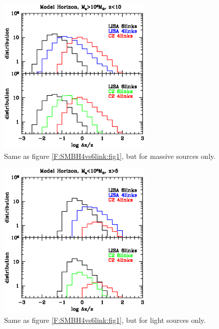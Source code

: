 \documentclass{iopart}
\begin{document}
\begin{figure}[H]
\center
   \includegraphics[width=0.65\textwidth]{FigSMBHModSel/FIG_comparison_massive.eps}
\caption{Same as figure \ref{F:SMBH4vs6link:fig1}, but for massive sources only.
\label{F:SMBH4vs6link:fig2} } 
\end{figure}

\begin{figure}[H]
\center
   \includegraphics[width=0.65\textwidth]{FigSMBHModSel/FIG_comparison_light.eps}
\caption{Same as figure \ref{F:SMBH4vs6link:fig1}, but for light sources only.
\label{F:SMBH4vs6link:fig3} } 
\end{figure}



\end{document}
